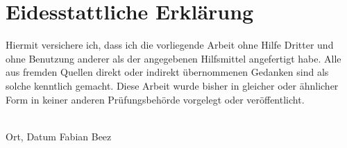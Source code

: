 \vspace*{4cm}
\section*{Eidesstattliche Erklärung}
\vfill
Hiermit versichere ich, dass ich die vorliegende Arbeit
ohne Hilfe Dritter und ohne Benutzung anderer als der angegebenen
Hilfsmittel angefertigt habe. Alle aus fremden Quellen direkt oder
indirekt übernommenen Gedanken sind als solche kenntlich gemacht. Diese
Arbeit wurde bisher in gleicher oder ähnlicher Form in keiner anderen
Prüfungsbehörde vorgelegt oder veröffentlicht.

\vfill
\noindent\dotfill\\
\hspace{2cm} Ort, Datum \hfill Fabian Beez
\vfill
\vfill\vfill\vfill\vfill\vfill
\newpage
